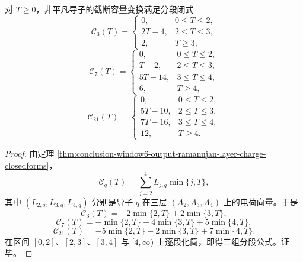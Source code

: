 \begin{theorem}\label{thm:conclusion-window6-output-truncated-capacity-conductor-activation}
对 \(T\ge 0\)，非平凡导子的截断容量变换满足分段闭式
\[
\mathcal C_3(T)=
\begin{cases}
0,& 0\le T\le 2,\\
2T-4,& 2\le T\le 3,\\
2,& T\ge 3,
\end{cases}
\]
\[
\mathcal C_7(T)=
\begin{cases}
0,& 0\le T\le 2,\\
T-2,& 2\le T\le 3,\\
5T-14,& 3\le T\le 4,\\
6,& T\ge 4,
\end{cases}
\]
\[
\mathcal C_{21}(T)=
\begin{cases}
0,& 0\le T\le 2,\\
5T-10,& 2\le T\le 3,\\
7T-16,& 3\le T\le 4,\\
12,& T\ge 4.
\end{cases}
\]
\end{theorem}
\begin{proof}
由定理 \ref{thm:conclusion-window6-output-ramanujan-layer-charge-closedforms}，
\[
\mathcal C_q(T)=\sum_{j=2}^4 L_{j,q}\min\{j,T\},
\]
其中 \((L_{2,q},L_{3,q},L_{4,q})\) 分别是导子 \(q\) 在三层 \((A_2,A_3,A_4)\) 上的电荷向量。于是
\[
\mathcal C_3(T)=-2\min\{2,T\}+2\min\{3,T\},
\]
\[
\mathcal C_7(T)=-\min\{2,T\}-4\min\{3,T\}+5\min\{4,T\},
\]
\[
\mathcal C_{21}(T)=-5\min\{2,T\}-2\min\{3,T\}+7\min\{4,T\}.
\]
在区间 \([0,2]\)、\([2,3]\)、\([3,4]\) 与 \([4,\infty)\) 上逐段化简，即得三组分段公式。证毕。
\end{proof}

